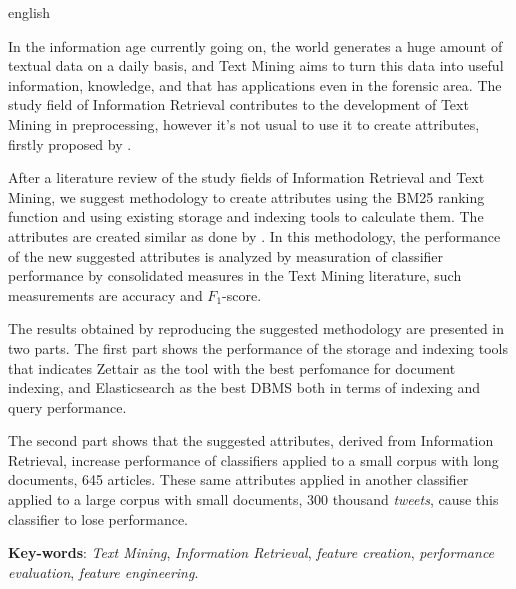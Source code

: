 \setlength{\absparsep}{18pt} %
\begin{resumo}[Abstract]
    \begin{otherlanguage*}{english}

        In the information age currently going on, the world generates a huge amount of textual data on a daily basis, and Text Mining aims to turn this data into useful information, knowledge, and that has applications even in the forensic area.
        The study field of Information Retrieval contributes to the development of Text Mining in preprocessing, however it's not usual to use it to create attributes, firstly proposed by .
        
        After a literature review of the study fields of Information Retrieval and Text Mining, we suggest methodology to create attributes using the BM25 ranking function and using existing storage and indexing tools to calculate them.
        The attributes are created similar as done by .
        In this methodology, the performance of the new suggested attributes is analyzed by measuration of classifier performance by consolidated measures in the Text Mining literature, such measurements are accuracy and $F_1$-score.

        The results obtained by reproducing the suggested methodology are presented in two parts. 
        The first part shows the performance of the storage and indexing tools that indicates Zettair as the tool with the best perfomance for document indexing, and Elasticsearch as the best DBMS both in terms of indexing and query performance.

        The second part shows that the suggested attributes, derived from Information Retrieval, increase performance of classifiers applied to a small corpus with long documents, 645 articles.
        These same attributes applied in another classifier applied to a large corpus with small documents, 300 thousand \textit{tweets}, cause this classifier to lose performance.
   
    	\vspace{\onelineskip}
    
    	\noindent
    	\textbf{Key-words}: \textit{Text Mining}, \textit{Information Retrieval}, \textit{feature creation}, \textit{performance evaluation}, \textit{feature engineering}.

    \end{otherlanguage*}
\end{resumo}